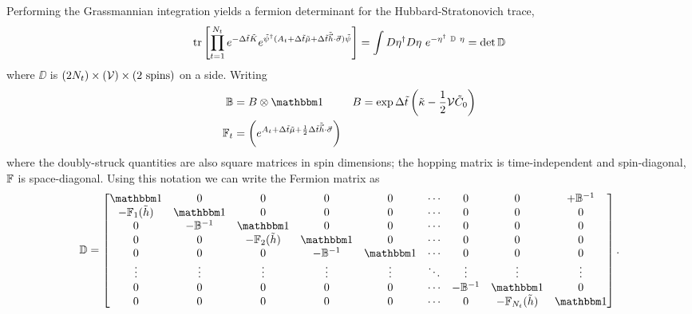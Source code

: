 Performing the Grassmannian integration yields a fermion determinant for the Hubbard-Stratonovich trace,
\begin{align}
	\text{tr}\left[\prod_{t=1}^{N_t} e^{-\Delta \tilde{t}\tilde{K}} e^{ \tilde{\psi}{}^{\dagger} (A_t + \Delta\tilde{t}\tilde{\mu} + \Delta\tilde{t}\tilde{\vec{h}}\cdot\vec{\sigma}) \tilde{\psi}} \right]
	=
	\int D\eta{}^{\dagger} D\eta ~ e^{- \eta^{\dagger} ~ \mathbb{D} ~ \eta} = \det \mathbb{D}
	\label{eq:fermion determinant with 2nt timeslices}
\end{align}
where $\DD$ is $(2N_t)\times(\mathcal{V})\times(2\text{ spins})$ on a side.
Writing
\begin{align}
	\BB &= B \otimes \one
	&
	B &= \exp \Delta\tilde{t} \left(\tilde{\kappa} - \half \Volume\tilde{C}_0\right)
	\label{eq:BB with C0}\\
	\FF_t &= \left(e^{A_{t}+\Delta\tilde{t}\tilde{\mu} + \half \Delta\tilde{t}\tilde{\vec{h}}\cdot\vec{\sigma}}\right)
	\label{eq:FF with C0}
\end{align}
where the doubly-struck quantities are also square matrices in spin dimensions; the hopping matrix is time-independent and spin-diagonal, $\mathbb{F}$ is space-diagonal.
Using this notation we can write the Fermion matrix as
\begin{align}
	\DD = \begin{bmatrix} 
			\one            & 0         & 0                 & 0         & 0      & \cdots & 0       & 0                     & +\BB^{-1}
		\\	-\FF_1(\tilde{h}) & \one      & 0                 & 0         & 0      & \cdots & 0       & 0                     & 0
		\\	0               & -\BB^{-1}   & \one              & 0         & 0      & \cdots & 0       & 0                     & 0
		\\	0               & 0         & -\FF_2(\tilde{h})   & \one      & 0      & \cdots & 0       & 0                     & 0
		\\	0               & 0         & 0                 & -\BB^{-1}   & \one   & \cdots & 0       & 0                     & 0
		\\	\vdots          & \vdots    & \vdots            & \vdots    & \vdots & \ddots & \vdots  & \vdots                & \vdots
		\\	0               & 0         & 0                 & 0         & 0      & \cdots & -\BB^{-1} & \one                  & 0
		\\	0               & 0         & 0                 & 0         & 0      & \cdots & 0       & -\FF_{N_t}(\tilde{h})   & \one
	\end{bmatrix}.
	\label{eq:DD}
\end{align}

